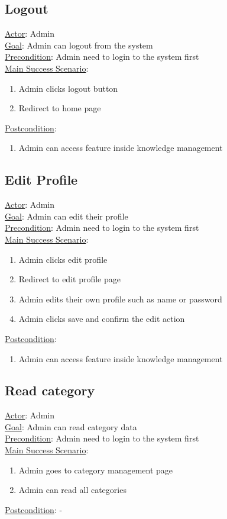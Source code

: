 \documentclass[12pt,oneside,openright,a4paper]{cpe-english-project}
\begin{document}
\subsection{Logout}
\underline{Actor}: Admin\\
\underline{Goal}: Admin can logout from the system\\
\underline{Precondition}: Admin need to login to the system first\\
\underline{Main Success Scenario}:
\begin{enumerate}[label={\arabic*.}]
	\item Admin clicks logout button      
	\item Redirect to home page
\end{enumerate}
\underline{Postcondition}: 
\begin{enumerate}[label={\arabic*.}]
	\item Admin can access feature inside knowledge management
\end{enumerate}

\subsection{Edit Profile}
\underline{Actor}: Admin\\
\underline{Goal}: Admin can edit their profile\\
\underline{Precondition}: Admin need to login to the system first\\
\underline{Main Success Scenario}:
\begin{enumerate}[label={\arabic*.}]
	\item Admin clicks edit profile       
	\item Redirect to edit profile page
	\item Admin edits their own profile such as name or password
	\item Admin clicks save and confirm the edit action
\end{enumerate}
\underline{Postcondition}: 
\begin{enumerate}[label={\arabic*.}]
	\item Admin can access feature inside knowledge management
\end{enumerate}

\subsection{Read category}
\underline{Actor}: Admin\\
\underline{Goal}: Admin can read category data\\
\underline{Precondition}: Admin need to login to the system first\\
\underline{Main Success Scenario}:
\begin{enumerate}[label={\arabic*.}]
	\item Admin goes to category management page      
	\item Admin can read all categories
\end{enumerate}
\underline{Postcondition}: -
\end{document}
